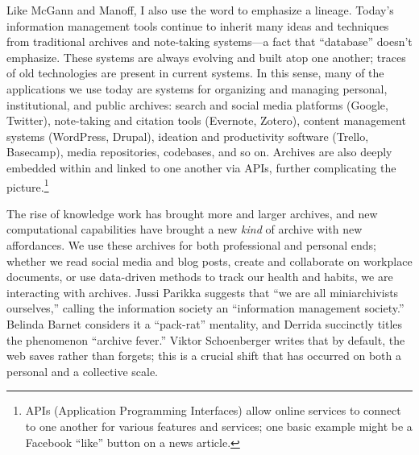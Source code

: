 Like McGann and Manoff, I also use the word to emphasize a lineage. Today's information management tools continue to inherit many ideas and techniques from traditional archives and note-taking systems---a fact that ``database'' doesn't emphasize. These systems are always evolving and built atop one another; traces of old technologies are present in current systems. In this sense, many of the applications we use today are systems for organizing and managing personal, institutional, and public archives: search and social media platforms (Google, Twitter), note-taking and citation tools (Evernote, Zotero), content management systems (WordPress, Drupal), ideation and productivity software (Trello, Basecamp), media repositories, codebases, and so on. Archives are also deeply embedded within and linked to one another via APIs, further complicating the picture.\footnote{APIs (Application Programming Interfaces) allow online services to connect to one another for various features and services; one basic example might be a Facebook ``like'' button on a news article.}

The rise of knowledge work has brought more and larger archives, and new computational capabilities have brought a new \emph{kind} of archive with new affordances. We use these archives for both professional and personal ends; whether we read social media and blog posts, create and collaborate on workplace documents, or use data-driven methods to track our health and habits, we are interacting with archives. Jussi Parikka suggests that ``we are all miniarchivists ourselves,'' calling the information society an ``information management society.''\autocite[2]{ernst_archival_2012} Belinda Barnet considers it a ``pack-rat'' mentality, and Derrida succinctly titles the phenomenon ``archive fever.'' Viktor Schoenberger writes that by default, the web saves rather than forgets; this is a crucial shift that has occurred on both a personal and a collective scale.\autocite{schoenberger_useful_2007}


